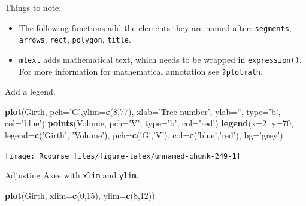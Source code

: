 \documentclass[]{book}
\newenvironment{Shaded}{\begin{snugshade}}{\end{snugshade}}
\newcommand{\KeywordTok}[1]{\textcolor[rgb]{0.13,0.29,0.53}{\textbf{#1}}}
\newcommand{\DataTypeTok}[1]{\textcolor[rgb]{0.13,0.29,0.53}{#1}}
\newcommand{\DecValTok}[1]{\textcolor[rgb]{0.00,0.00,0.81}{#1}}
\newcommand{\StringTok}[1]{\textcolor[rgb]{0.31,0.60,0.02}{#1}}
\newcommand{\NormalTok}[1]{#1}
\providecommand{\tightlist}{%
  \setlength{\itemsep}{0pt}\setlength{\parskip}{0pt}}
\theoremstyle{definition}
\theoremstyle{definition}
\theoremstyle{definition}
\theoremstyle{remark}
\begin{document}
Things to note:

\begin{itemize}
\tightlist
\item
  The following functions add the elements they are named after:
  \texttt{segments}, \texttt{arrows}, \texttt{rect}, \texttt{polygon},
  \texttt{title}.
\item
  \texttt{mtext} adds mathematical text, which needs to be wrapped in
  \texttt{expression()}. For more information for mathematical
  annotation see \texttt{?plotmath}.
\end{itemize}

Add a legend.

\begin{Shaded}
\begin{Highlighting}[]
\KeywordTok{plot}\NormalTok{(Girth, }\DataTypeTok{pch=}\StringTok{'G'}\NormalTok{,}\DataTypeTok{ylim=}\KeywordTok{c}\NormalTok{(}\DecValTok{8}\NormalTok{,}\DecValTok{77}\NormalTok{), }\DataTypeTok{xlab=}\StringTok{'Tree number'}\NormalTok{, }\DataTypeTok{ylab=}\StringTok{''}\NormalTok{, }\DataTypeTok{type=}\StringTok{'b'}\NormalTok{, }\DataTypeTok{col=}\StringTok{'blue'}\NormalTok{)}
\KeywordTok{points}\NormalTok{(Volume, }\DataTypeTok{pch=}\StringTok{'V'}\NormalTok{, }\DataTypeTok{type=}\StringTok{'b'}\NormalTok{, }\DataTypeTok{col=}\StringTok{'red'}\NormalTok{)}
\KeywordTok{legend}\NormalTok{(}\DataTypeTok{x=}\DecValTok{2}\NormalTok{, }\DataTypeTok{y=}\DecValTok{70}\NormalTok{, }\DataTypeTok{legend=}\KeywordTok{c}\NormalTok{(}\StringTok{'Girth'}\NormalTok{, }\StringTok{'Volume'}\NormalTok{), }\DataTypeTok{pch=}\KeywordTok{c}\NormalTok{(}\StringTok{'G'}\NormalTok{,}\StringTok{'V'}\NormalTok{), }\DataTypeTok{col=}\KeywordTok{c}\NormalTok{(}\StringTok{'blue'}\NormalTok{,}\StringTok{'red'}\NormalTok{), }\DataTypeTok{bg=}\StringTok{'grey'}\NormalTok{)}
\end{Highlighting}
\end{Shaded}

\texttt{[image: Rcourse\_files/figure-latex/unnamed-chunk-249-1]}

Adjusting Axes with \texttt{xlim} and \texttt{ylim}.

\begin{Shaded}
\begin{Highlighting}[]
\KeywordTok{plot}\NormalTok{(Girth, }\DataTypeTok{xlim=}\KeywordTok{c}\NormalTok{(}\DecValTok{0}\NormalTok{,}\DecValTok{15}\NormalTok{), }\DataTypeTok{ylim=}\KeywordTok{c}\NormalTok{(}\DecValTok{8}\NormalTok{,}\DecValTok{12}\NormalTok{))}
\end{Highlighting}
\end{Shaded}
\end{document}

